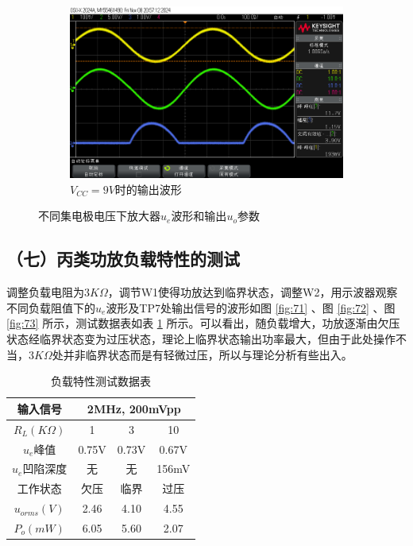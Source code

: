 \documentclass[UTF8]{ctexart}
\begin{document}
\begin{figure}[H]
    \begin{subfigure}[c]{0.45\textwidth}
        \centering
        \includegraphics[width=\textwidth]{pics/63.png}
        \caption{$V_{CC}=9V$时的输出波形}\label{fig:63}
    \end{subfigure}
    \caption{不同集电极电压下放大器$u_e$波形和输出$u_o$参数}\label{fig:6}
\end{figure}
\vspace{-1em}
\subsection*{（七）丙类功放负载特性的测试}
调整负载电阻为$3K\Omega$，调节W1使得功放达到临界状态，调整W2，用示波器观察不同负载阻值下的$u_e$波形及TP7处输出信号的波形如图 \ref{fig:71} 、图 \ref{fig:72} 、图 \ref{fig:73} 所示，测试数据表如表 \ref{table:7.1} 所示。可以看出，随负载增大，功放逐渐由欠压状态经临界状态变为过压状态，理论上临界状态输出功率最大，但由于此处操作不当，$3K\Omega$处并非临界状态而是有轻微过压，所以与理论分析有些出入。
\begin{table}[H]
    \centering
    \caption{负载特性测试数据表}
    \label{table:7.1}
    \begin{tabular}{c|ccc}
    \hline
    输入信号           & \multicolumn{3}{c}{2MHz, 200mVpp}                      \\ \hline
    $R_L(K\Omega)$ & \multicolumn{1}{c|}{1}  & \multicolumn{1}{c|}{3}  & 10 \\ \hline
    $u_e$峰值        & \multicolumn{1}{c|}{0.75V}   & \multicolumn{1}{c|}{0.73V}  &    0.67V\\ \hline
    $u_e$凹陷深度      & \multicolumn{1}{c|}{无}   & \multicolumn{1}{c|}{无}   &    156mV\\ \hline
    工作状态           & \multicolumn{1}{c|}{欠压} & \multicolumn{1}{c|}{临界} & 过压 \\ \hline
    $u_{orms}(V)$  & \multicolumn{1}{c|}{2.46}   & \multicolumn{1}{c|}{4.10}   &   4.55 \\ \hline
    $P_o(mW)$      & \multicolumn{1}{c|}{6.05}   & \multicolumn{1}{c|}{5.60}   &   2.07 \\ \hline
    \end{tabular}
\end{table}
\end{document}
